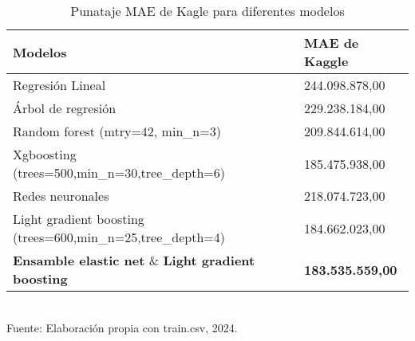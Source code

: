 \begin{table}[H]
\centering
\caption{Punataje MAE de Kagle para diferentes modelos}
\begin{tabular}{ll}
\toprule
\textbf{Modelos} & \textbf{MAE de Kaggle} \\
\midrule
Regresión Lineal & 244.098.878,00 \\
Árbol de regresión & 229.238.184,00 \\
Random forest (mtry=42, min\_n=3) & 209.844.614,00 \\
Xgboosting (trees=500,min\_n=30,tree\_depth=6)& 185.475.938,00 \\
Redes neuronales  & 218.074.723,00 \\
Light gradient boosting (trees=600,min\_n=25,tree\_depth=4) & 184.662.023,00 \\
\textbf{Ensamble elastic net} \& \textbf{Light gradient boosting} & \textbf{183.535.559,00} \\
\bottomrule
\end{tabular} \\
\label{tab:mae_kaggle}
\footnotesize Fuente: Elaboración propia con train.csv, 2024.
\end{table}

